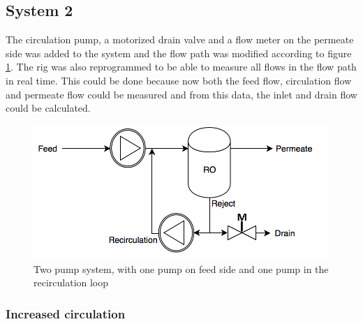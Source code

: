 \newpage

\subsection{System 2}

The circulation pump, a motorized drain valve and a flow meter on the permeate side was added to the system and the flow path was modified according to figure \ref{fig:System2_1}. The rig was also reprogrammed to be able to measure all flows in the flow path in real time. This could be done because now both the feed flow, circulation flow and permeate flow could be measured and from this data, the inlet and drain flow could be calculated.  

\begin{figure}[H]
  \centering
  \includegraphics[width=1\linewidth]{Sys2}
  \caption{Two pump system, with one pump on feed side and one pump in the recirculation loop}
  \label{fig:System2_1}
\end{figure}


\newpage
\subsubsection{Increased circulation}

